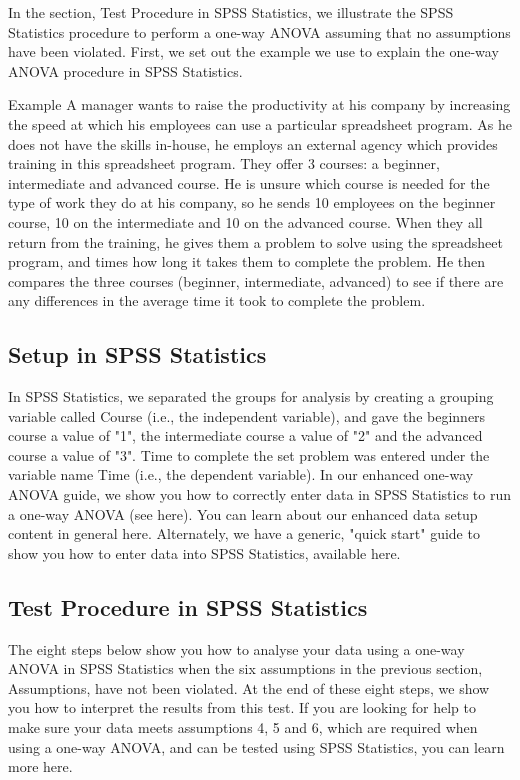 \documentclass[]{article}
\begin{document}
In the section, Test Procedure in SPSS Statistics, we illustrate the SPSS Statistics procedure to perform a one-way ANOVA assuming that no assumptions have been violated. First, we set out the example we use to explain the one-way ANOVA procedure in SPSS Statistics.

Example
A manager wants to raise the productivity at his company by increasing the speed at which his employees can use a particular spreadsheet program. As he does not have the skills in-house, he employs an external agency which provides training in this spreadsheet program. They offer 3 courses: a beginner, intermediate and advanced course. He is unsure which course is needed for the type of work they do at his company, so he sends 10 employees on the beginner course, 10 on the intermediate and 10 on the advanced course. When they all return from the training, he gives them a problem to solve using the spreadsheet program, and times how long it takes them to complete the problem. He then compares the three courses (beginner, intermediate, advanced) to see if there are any differences in the average time it took to complete the problem.

\subsection{Setup in SPSS Statistics}
In SPSS Statistics, we separated the groups for analysis by creating a grouping variable called Course (i.e., the independent variable), and gave the beginners course a value of "1", the intermediate course a value of "2" and the advanced course a value of "3". Time to complete the set problem was entered under the variable name Time (i.e., the dependent variable). In our enhanced one-way ANOVA guide, we show you how to correctly enter data in SPSS Statistics to run a one-way ANOVA (see here). You can learn about our enhanced data setup content in general here. Alternately, we have a generic, "quick start" guide to show you how to enter data into SPSS Statistics, available here.

\subsection{Test Procedure in SPSS Statistics}
The eight steps below show you how to analyse your data using a one-way ANOVA in SPSS Statistics when the six assumptions in the previous section, Assumptions, have not been violated. At the end of these eight steps, we show you how to interpret the results from this test. If you are looking for help to make sure your data meets assumptions 4, 5 and 6, which are required when using a one-way ANOVA, and can be tested using SPSS Statistics, you can learn more here.
\end{document}
